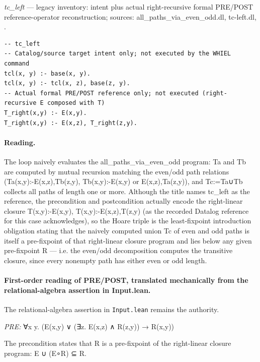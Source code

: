 \documentclass[10pt]{article}
\begin{document}
{\raggedright\textit{tc\_left} --- legacy inventory:  intent plus actual right-recursive formal PRE/POST reference-operator reconstruction; sources: all\_paths\_via\_even\_odd.dl, tc-left.dl, .\par}

\begin{Verbatim}[fontsize=\scriptsize,breaklines=true,breakanywhere=true,frame=single,framesep=1.5mm]
-- tc_left
-- Catalog/source target intent only; not executed by the WHIEL command
tcl(x, y) :- base(x, y).
tcl(x, y) :- tcl(x, z), base(z, y).
-- Actual formal PRE/POST reference only; not executed (right-recursive E composed with T)
T_right(x,y) :- E(x,y).
T_right(x,y) :- E(x,z), T_right(z,y).
\end{Verbatim}

\paragraph{Reading.} The loop naively evaluates the all\_paths\_via\_even\_odd program: Ta and Tb are computed by mutual recursion matching the even/odd path relations (Ta(x,y):-E(x,z),Tb(z,y), Tb(x,y):-E(x,y) or E(x,z),Ta(z,y)), and Tc:=Ta∪Tb collects all paths of length one or more. Although the title names tc\_left as the reference, the precondition and postcondition actually encode the right-linear closure T(x,y):-E(x,y), T(x,y):-E(x,z),T(z,y) (as the recorded Datalog reference for this case acknowledges), so the Hoare triple is the least-fixpoint introduction obligation stating that the naively computed union Tc of even and odd paths is itself a pre-fixpoint of that right-linear closure program and lies below any given pre-fixpoint R --- i.e. the even/odd decomposition computes the transitive closure, since every nonempty path has either even or odd length.

\paragraph{First-order reading of PRE/POST, translated mechanically from the relational-algebra assertion in Input.lean.} The relational-algebra assertion in \texttt{Input.lean} remains the authority.

\textit{PRE:} ∀x y. (E(x,y) ∨ (∃z. E(x,z) ∧ R(z,y)) → R(x,y))\par The precondition states that R is a pre-fixpoint of the right-linear closure program: E ∪ (E∘R) ⊆ R.
\end{document}
